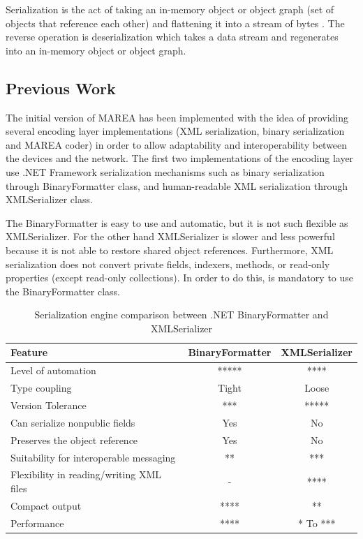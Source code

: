 Serialization is the act of taking an in-memory object or object graph (set of objects that reference each other) and flattening it into a stream of bytes \cite{cite:serialization}. The reverse operation is deserialization which takes a data stream and regenerates into an in-memory object or object graph.

\subsection{Previous Work}\label{SS:Encoding-Layer-Previous-Work}
The initial version of MAREA has been implemented with the idea of providing several encoding layer implementations (XML serialization, binary serialization and MAREA coder) in order to allow adaptability and interoperability between the devices and the network. The first two implementations of the encoding layer use .NET Framework serialization mechanisms such as binary serialization through BinaryFormatter class, and human-readable XML serialization through XMLSerializer class.

The BinaryFormatter is easy to use and automatic, but it is not such flexible as XMLSerializer. For the other hand XMLSerializer is slower and less powerful because it is not able to restore shared object references.  Furthermore, XML serialization does not convert private fields, indexers, methods, or read-only properties (except read-only collections). In order to do this, is mandatory to use the BinaryFormatter class.

\begin{table}[H]
\begin{center}
\caption{\nohyphens{Serialization engine comparison between .NET BinaryFormatter and XMLSerializer}}
\label{T:NetBinaryXML}
\begin{tabular}{|l|c|c|}
\hline
{\bf Feature} & {\bf BinaryFormatter} & {\bf XMLSerializer}          \\ \hline \hline
Level of automation                            & *****   & ****      \\ \hline
Type coupling                                  & Tight   & Loose     \\ \hline
Version Tolerance                              & ***    & *****      \\ \hline
Can serialize nonpublic fields                 & Yes   & No           \\ \hline
Preserves the object reference        		   & Yes   & No           \\ \hline
Suitability for interoperable messaging        & **    & ***         \\ \hline
Flexibility in reading/writing XML files       & -     & ****        \\ \hline
Compact output                                 & ****  & **           \\ \hline
Performance                                    & ****  & * To ***       \\ \hline
\end{tabular}
\end{center}
\end{table}

